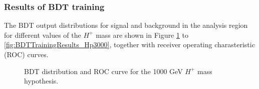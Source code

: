 \subsubsection{Results of BDT training}
\label{subsubsec:ResultBDTTraingin}
The BDT output distributions for signal and background in the analysis region for different values of the $H^+$ mass are shown in Figure \ref{fig:BDTTrainingResults_Hp1000} to \ref{fig:BDTTrainingResults_Hp3000}, together with receiver operating charasteristic (ROC) curves.

\begin{figure}[H]
  \centering
  \caption{BDT distribution and ROC curve for the 1000 GeV $H^{+}$ mass hypothesis.}
  \label{fig:BDTTrainingResults_Hp1000}
\end{figure}

